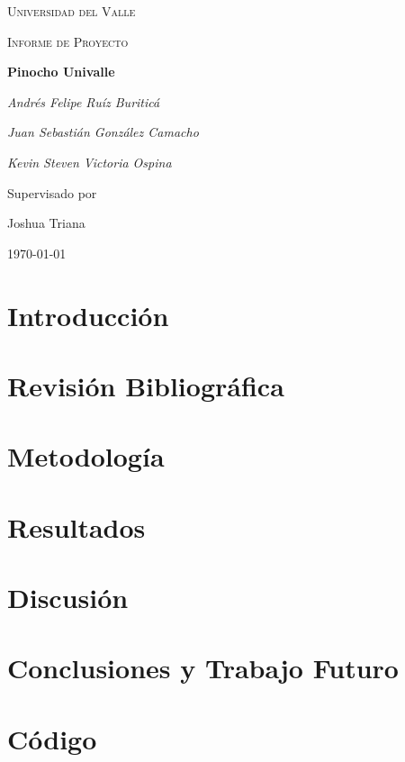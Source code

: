 \documentclass[12pt]{report}
\begin{document}
\begin{titlepage}
	\centering
	{\scshape\LARGE Universidad del Valle\par}
	\vspace{1cm}
	{\scshape\Large Informe de Proyecto\par}
	\vspace{1.5cm}
	{\huge\bfseries Pinocho Univalle\par}
	\vspace{2cm}
	{\Large\itshape Andrés Felipe Ruíz Buriticá\par}
    {\Large\itshape Juan Sebastián González Camacho\par}
	{\Large\itshape Kevin Steven Victoria Ospina\par}
	\vfill
	Supervisado por\par
	Joshua Triana

	\vfill

	{\large \today\par}
\end{titlepage}

\tableofcontents

\chapter{Introducción}

\chapter{Revisión Bibliográfica}


\chapter{Metodología}


\chapter{Resultados}


\chapter{Discusión}


\chapter{Conclusiones y Trabajo Futuro}


\appendix
\chapter{Código}




\end{document}
